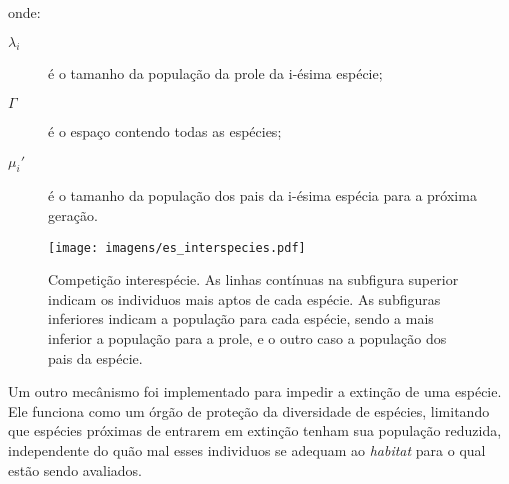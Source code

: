 \noindent onde:

\begin{description}
\item[$\lambda_i$] é o tamanho da população da prole da i-ésima
espécie;
\item[$\Gamma$] é o espaço contendo todas as espécies;
\item[$\mu_{i}'$] é o tamanho da população dos pais da i-ésima espécia
para a próxima geração.
\end{description}


\begin{figure}[h!t]
\centering
\texttt{[image: imagens/es\_interspecies.pdf]}
\caption[Competição interespécie.]{Competição interespécie. As linhas
contínuas na subfigura superior indicam os individuos mais aptos de
cada espécie. As subfiguras inferiores indicam a população para cada
espécie, sendo a mais inferior a população para a prole, e o outro
caso a população dos pais da espécie.%
}
\label{fig:interespecies}
\end{figure}

Um outro mecânismo foi implementado para impedir a extinção de uma
espécie. Ele funciona como um órgão de proteção da diversidade de
espécies, limitando que espécies próximas de entrarem em extinção
tenham sua população reduzida, independente do quão mal esses
individuos se adequam ao \emph{habitat} para o qual estão sendo
avaliados.

